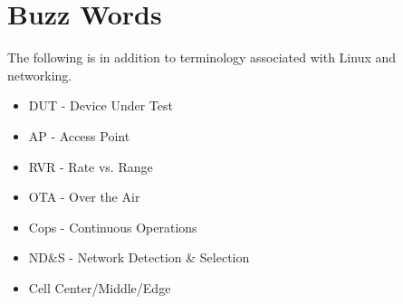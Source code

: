 \documentclass{article}
\begin{document}
\section*{Buzz Words}
The following is in addition to terminology associated with Linux and 
networking.
\begin{itemize}
\item DUT - Device Under Test
\item AP - Access Point
\item RVR - Rate vs. Range
\item OTA - Over the Air
\item Cops - Continuous Operations
\item ND\&S - Network Detection \& Selection
\item Cell Center/Middle/Edge
\end{itemize}
\end{document}
